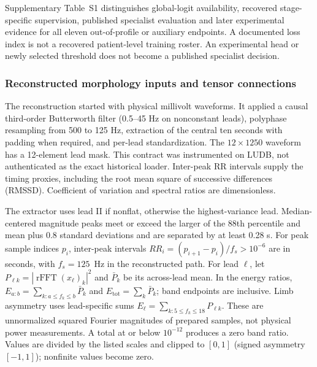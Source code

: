 \documentclass[life,article,submit,moreauthors]{Definitions/mdpi}
\begin{document}
Supplementary Table~S1 distinguishes global-logit availability, recovered stage-specific supervision, published specialist evaluation and later experimental evidence for all eleven out-of-profile or auxiliary endpoints. A documented loss index is not a recovered patient-level training roster. An experimental head or newly selected threshold does not become a published specialist decision.

\subsubsection{Reconstructed morphology inputs and tensor connections}
\label{sec:morphology}

The reconstruction started with physical millivolt waveforms. It applied a causal third-order Butterworth filter (0.5--45 Hz on nonconstant leads), polyphase resampling from 500 to 125 Hz, extraction of the central ten seconds with padding when required, and per-lead standardization. The $12\times1250$ waveform has a 12-element lead mask. This contract was instrumented on LUDB, not authenticated as the exact historical loader. Inter-peak RR intervals supply the timing proxies, including the root mean square of successive differences (RMSSD). Coefficient of variation and spectral ratios are dimensionless.

The extractor uses lead II if nonflat, otherwise the highest-variance lead. Median-centered magnitude peaks meet or exceed the larger of the 88th percentile and mean plus 0.8 standard deviations and are separated by at least 0.28 s. For peak sample indices $p_i$, inter-peak intervals $RR_i=(p_{i+1}-p_i)/f_s>10^{-6}$ are in seconds, with $f_s=125$~Hz in the reconstructed path. For lead $\ell$, let $P_{\ell k}=|\operatorname{rFFT}(x_\ell)_k|^2$ and $\bar P_k$ be its across-lead mean. In the energy ratios, $E_{a:b}=\sum_{k:a\le f_k\le b}\bar P_k$ and $E_{\mathrm{tot}}=\sum_k\bar P_k$; band endpoints are inclusive. Limb asymmetry uses lead-specific sums $E_\ell=\sum_{k:5\le f_k\le18}P_{\ell k}$. These are unnormalized squared Fourier magnitudes of prepared samples, not physical power measurements. A total at or below $10^{-12}$ produces a zero band ratio. Values are divided by the listed scales and clipped to $[0,1]$ (signed asymmetry $[-1,1]$); nonfinite values become zero.
\end{document}
